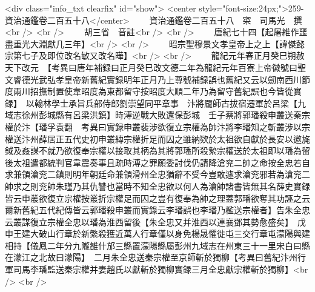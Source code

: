 <div class="info_txt clearfix" id="show">
<center style="font-size:24px;">259-資治通鑑卷二百五十八</center>
  　　資治通鑑卷二百五十八　寀　司馬光　撰<br />
<br />
　　胡三省　音註<br />
<br />
　　唐紀七十四【起屠維作噩盡重光大淵獻几三年】<br />
<br />
　　昭宗聖穆景文孝皇帝上之上【諱傑懿宗第七子及即位改名敏又改名曄】<br />
<br />
　　龍紀元年春正月癸巳朔赦天下改元　【考異曰唐年補録曰正月癸巳改文德二年為龍紀元年百寮上帝徽號曰聖文睿德光武弘孝皇帝新舊紀實録明年正月乃上尊號補録誤也舊紀又云以劒南西川節度兩川招撫制置使韋昭度為東都留守按昭度大順二年乃為留守舊紀誤也今皆從實録】　以翰林學士承旨兵部侍郎劉崇望同平章事　汴將龎師古拔宿遷軍於呂梁【九域志徐州彭城縣有呂梁洪鎮】時溥逆戰大敗還保彭城　壬子蔡將郭璠殺申叢送秦宗權於汴【璠孚袁翻　考異曰實録申叢裴涉欲復立宗權為帥汴將李璠知之斬叢涉以宗權送汴州薛居正五代史初申叢縳宗權折足而囚之雖納欵於太祖欲自獻於長安以邀旄鉞及姦謀不就乃欲復奉宗權以接取其柄為其將郭璠所殺縶宗權送於太祖即以璠為留後太祖遣都統判官韋震奏事且疏時溥之罪願委討伐仍請降滄兖二帥之命按全忠若自求兼領滄兖二鎮則明年朝廷命兼領滑州全忠猶辭不受今豈敢遽求滄兖邪若為滄兖二帥求之則兖帥朱瑾乃其仇讐也當時不知全忠欲以何人為滄帥諸書皆無其名薛史實録皆云申叢欲復立宗權按叢折宗權足而囚之豈有復奉為帥之理蓋郭璠欲奪其功誣之云爾新舊紀五代紀傳皆云郭璠殺申叢而實錄云李璠誤也李璠乃檻送宗權者】告朱全忠云叢謀復立宗權全忠以璠為淮西留後【朱全忠又并淮西以連襄鄧其勢愈盛矣】　戊申王建大破山行章於新繁殺獲近萬人行章僅以身免楊晟懼徙屯三交行章屯濛陽與建相持【儀鳳二年分九隴雒什邡三縣置濛陽縣屬彭州九域志在州東三十一里宋白曰縣在濛江之北故曰濛陽】　二月朱全忠送秦宗權至京師斬於獨柳【考異曰舊紀汴州行軍司馬李璠監送秦宗權并妻趙氏以獻斬於獨柳實録三月全忠獻宗權斬於獨柳】<br />
<br />
